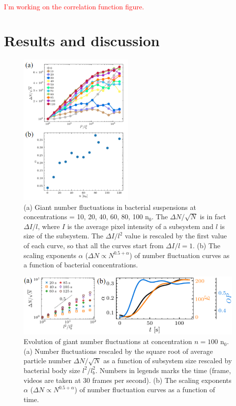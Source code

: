 \documentclass[twocolumn,aps,pre,amsmath,amssymb,floatfix,longbibliography]{revtex4-1}
\begin{document}
\textcolor{red}{I'm working on the correlation function figure.}

\section{Results and discussion}

\begin{figure}[!]
\begin{center}
\includegraphics[width=0.5\textwidth]{GNF-figures-3-v2.png}
\caption[]{(a) Giant number fluctuations in bacterial suspensions at concentrations = 10, 20, 40, 60, 80, 100 n$_0$. The $\Delta N/\sqrt{N}$ is in fact $\Delta I/l$, where $I$ is the average pixel intensity of a subsystem and $l$ is size of the subsystem. The $\Delta I/l^2$ value is rescaled by the first value of each curve, so that all the curves start from $\Delta I/l=1$. (b) The scaling exponents $\alpha$ ($\Delta N \propto N^{0.5+\alpha}$) of number fluctuation curves as a function of bacterial concentrations.}
\label{fig:3}
\end{center}
\end{figure}

\begin{figure}[!]\label{fig:4}
\begin{center}
\includegraphics[width=\textwidth]{GNF_figure-4-v1.png}
\caption[]{Evolution of giant number fluctuations at concentration $n=100$ n$_0$. (a) Number fluctuations rescaled by the square root of average particle number $\Delta N/\sqrt N$ as a function of subsystem size rescaled by bacterial body size $l^2/l_b^2$. Numbers in legends marks the time (frame, videos are taken at 30 frames per second).  (b) The scaling exponents $\alpha$ ($\Delta N \propto N^{0.5+\alpha}$) of number fluctuation curves as a function of time.}

\end{center}
\end{figure}
\end{document}
